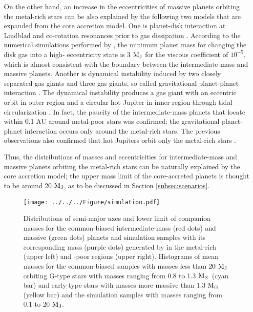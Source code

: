 \documentclass[twocolumn, dvipdfmx]{aastex62}
\begin{document}
\begin{CJK*}{UTF8}{min}
On the other hand, an increase in the eccentricities of massive planets orbiting the metal-rich stars can be also explained by the following two models that are expanded from the core accretion model. One is planet-disk interaction at Lindblad and co-rotation resonances prior to gas dissipation \citep[e.g.,][]{2003ApJ...585.1024G}. According to the numerical simulations performed by \cite{2006A&A...447..369K}, the minimum planet mass for changing the disk gas into a high- eccentricity state is 3 $\rm M_J$ for the viscous coefficient of $10^{-5}$, which is almost consistent with the boundary between the intermediate-mass and massive planets. Another is dynamical instability induced by two closely separated gas giants and three gas giants, so called gravitational planet-planet interaction \citep[e.g.,][]{2013ApJ...775...42I}. The dynamical instability produces a gas giant with an eccentric orbit in outer region and a circular hot Jupiter in inner region through tidal circularization \citep[e.g.,][]{1996Sci...274..954R}. In fact, the paucity of the intermediate-mass planets that locate within 0.1 AU around metal-poor stars was confirmed; the gravitational planet-planet interaction occurs only around the metal-rich stars. The previous observations also confirmed that hot Jupiters orbit only the metal-rich stars \citep{2013ApJ...767L..24D, 2013A&A...560A..51A}.

Thus, the distributions of masses and eccentricities for intermediate-mass and massive planets orbiting the metal-rich stars can be naturally explained by the core accretion model; the upper mass limit of the core-accreted planets is thought to be around 20 $\rm M_J$, as to be discussed in Section \ref{subsec:scenarios}.

\begin{figure}[t]
\begin{center}
\texttt{[image: ../../../Figure/simulation.pdf]}
\caption{Distributions of semi-major axes and lower limit of companion masses for the common-biased intermediate-mass (red dots) and massive (green dots) planets and simulation samples with its corresponding mass (purple dots) generated by \cite{2012A&A...541A..97M} in the metal-rich (upper left) and -poor regions (upper right). Histograms of mean masses for the common-biased samples with masses less than 20 $\rm M_J$ orbiting G-type stars with masses ranging from 0.8 to 1.3 $\rm M_{\odot}$ (cyan bar) and early-type stars with masses more massive than 1.3 $\rm M_{\odot}$ (yellow bar) and the simulation samples with masses ranging from 0.1 to 20 $\rm M_J$. \label{fig:simulation}}
\end{center}
\end{figure}



\end{CJK*}
\end{document}
